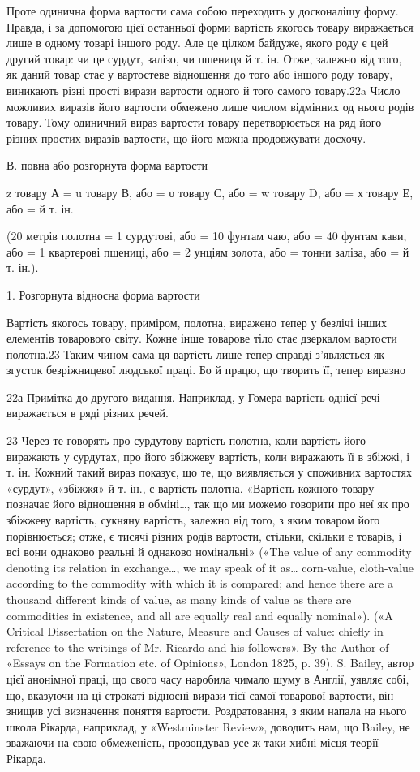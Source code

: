 Проте одинична форма вартости сама собою переходить у досконалішу
форму. Правда, і за допомогою цієї останньої форми вартість
якогось товару виражається лише в одному товарі іншого
роду. Але це цілком байдуже, якого роду є цей другий товар: чи
це сурдут, залізо, чи пшениця й т. ін. Отже, залежно від того,
як даний товар стає у вартостеве відношення до того або іншого
роду товару, виникають різні прості вирази вартости одного й
того самого товару.22a Число можливих виразів його вартости
обмежено лише числом відмінних од нього родів товару. Тому
одиничний вираз вартости товару перетворюється на ряд його
різних простих виразів вартости, що його можна продовжувати
досхочу.

В. повна або розгорнута форма вартости

z товару А = u товару В, або = υ товару С, або = w товару D,
або = х товару Е, або = й т. ін.

(20 метрів полотна = 1 сурдутові, або = 10 фунтам чаю, або = 40 фунтам
кави, або = 1 квартерові пшениці, або = 2 унціям золота, або =  тонни
заліза, або = й т. ін.).

1. Розгорнута відносна форма вартости

Вартість якогось товару, приміром, полотна, виражено тепер
у безлічі інших елементів товарового світу. Кожне інше товарове
тіло стає дзеркалом вартости полотна.23 Таким чином сама ця
вартість лише тепер справді з’являється як згусток безріжницевої
людської праці. Бо й працю, що творить її, тепер виразно

22а Примітка до другого видання. Наприклад, у Гомера вартість
однієї речі виражається в ряді різних речей.

23 Через те говорять про сурдутову вартість полотна, коли вартість
його виражають у сурдутах, про його збіжжеву вартість, коли виражають
її в збіжжі, і т. ін. Кожний такий вираз показує, що те, що виявляється
у споживних вартостях «сурдут», «збіжжя» й т. ін., є вартість полотна.
«Вартість кожного товару позначає його відношення в обміні…,
так що ми можемо говорити про неї як про збіжжеву вартість, сукняну
вартість, залежно від того, з яким товаром його порівнюється; отже, є
тисячі різних родів вартости, стільки, скільки є товарів, і всі вони однаково
реальні й однаково номінальні» («The value of any commodity denoting
its relation in exchange…, we may speak of it as… corn-value,
cloth-value according to the commodity with which it is compared; and
hence there are a thousand different kinds of value, as many kinds
of value as there are commodities in existence, and all are equally real
and equally nominal»). («A Critical Dissertation on the Nature, Measure
and Causes of value: chiefly in reference to the writings of Mr. Ricardo
and his followers». By the Author of «Essays on the Formation etc. of Opinions»,
London 1825, p. 39). S. Bailey, автор цієї анонімної праці, що
свого часу наробила чимало шуму в Англії, уявляє собі, що, вказуючи
на ці строкаті відносні вирази тієї самої товарової вартости, він знищив
усі визначення поняття вартости. Роздратовання, з яким напала на нього
школа Рікарда, наприклад, у «Westminster Review», доводить нам, що
Bailey, не зважаючи на свою обмеженість, прозондував усе ж таки
хибні місця теорії Рікарда.
